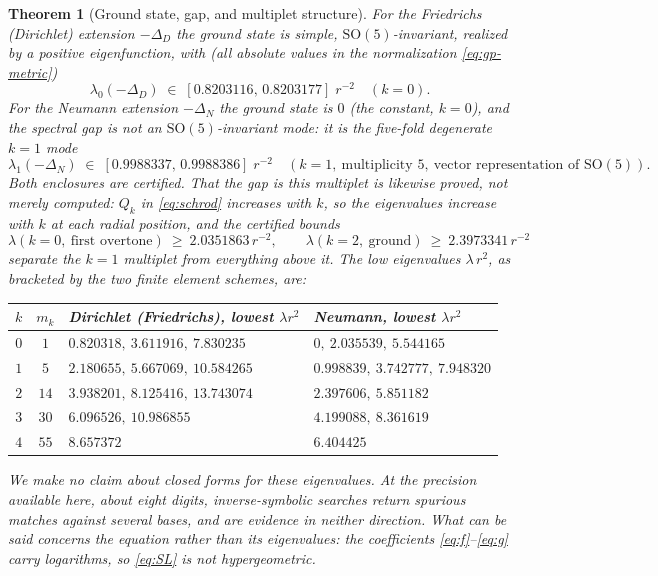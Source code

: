 \documentclass[11pt,letterpaper]{article}
\newcommand{\Lap}{\Delta}
\newcommand{\SO}{\mathrm{SO}}
\theoremstyle{plain}
\newtheorem{theorem}{Theorem}[section]
\theoremstyle{remark}
\begin{document}
\begin{theorem}[Ground state, gap, and multiplet structure]\label{thm:groundstate}
For the Friedrichs (Dirichlet) extension $-\Lap_D$ the ground state is simple, $\SO(5)$-invariant, realized by a positive eigenfunction, with (all absolute values in the normalization \eqref{eq:gp-metric})
\[
  \lambda_0(-\Lap_D)\;\in\;[0.8203116,\,0.8203177]\;r^{-2}\quad(k=0).
\]
For the Neumann extension $-\Lap_N$ the ground state is $0$ (the constant, $k=0$), and the spectral gap is \emph{not} an $\SO(5)$-invariant mode: it is the five-fold degenerate $k=1$ mode
\[
  \lambda_1(-\Lap_N)\;\in\;[0.9988337,\,0.9988386]\;r^{-2}\quad(k=1,\ \text{multiplicity }5,\ \text{vector representation of }\SO(5)).
\]
Both enclosures are certified. That the gap is this multiplet is likewise proved, not merely computed: $Q_k$ in \eqref{eq:schrod} increases with $k$, so the eigenvalues increase with $k$ at each radial position, and the certified bounds
\[
  \lambda(k=0,\ \text{first overtone})\ \ge\ 2.0351863\,r^{-2},
  \qquad \lambda(k=2,\ \text{ground})\ \ge\ 2.3973341\,r^{-2}
\]
separate the $k=1$ multiplet from everything above it. The low eigenvalues $\lambda\,r^2$, as bracketed by the two finite element schemes, are:
\begin{center}\small
\begin{tabular}{@{}c c l l@{}}
\toprule
$k$ & $m_k$ & Dirichlet (Friedrichs), lowest $\lambda r^2$ & Neumann, lowest $\lambda r^2$\\
\midrule
$0$ & $1$  & $0.820318,\ 3.611916,\ 7.830235$ & $0,\ 2.035539,\ 5.544165$\\
$1$ & $5$  & $2.180655,\ 5.667069,\ 10.584265$ & $0.998839,\ 3.742777,\ 7.948320$\\
$2$ & $14$ & $3.938201,\ 8.125416,\ 13.743074$ & $2.397606,\ 5.851182$\\
$3$ & $30$ & $6.096526,\ 10.986855$ & $4.199088,\ 8.361619$\\
$4$ & $55$ & $8.657372$ & $6.404425$\\
\bottomrule
\end{tabular}
\end{center}
We make no claim about closed forms for these eigenvalues. At the precision available here, about eight digits, inverse-symbolic searches return spurious matches against several bases, and are evidence in neither direction. What can be said concerns the equation rather than its eigenvalues: the coefficients \eqref{eq:f}--\eqref{eq:g} carry logarithms, so \eqref{eq:SL} is not hypergeometric.
\end{theorem}
\end{document}
